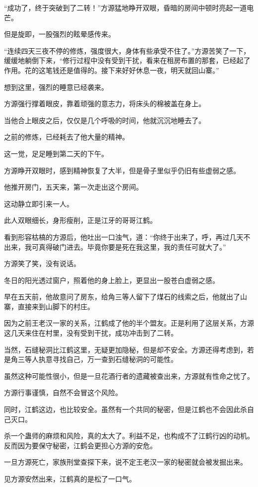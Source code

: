 \begin{this_body}
“成功了，终于突破到了二转！”方源猛地睁开双眼，昏暗的房间中顿时亮起一道电芒。

但是旋即，一股强烈的眩晕感传来。

“连续四天三夜不停的修炼，强度很大，身体有些承受不住了。”方源苦笑了一下，缓缓地躺倒下来，“修行过程中没有受到干扰，看来在租房布置的那套，已经起了作用。花的这笔钱还是值得的。接下来好好休息一夜，明天就回山寨。”

想到这里，强烈的睡意已经袭来。

方源强行撑着眼皮，靠着顽强的意志力，将床头的棉被盖在身上。

当他合上眼皮之后，仅仅是几个呼吸的时间，他就沉沉地睡去了。

之前的修炼，已经耗去了他大量的精神。

这一觉，足足睡到第二天的下午。

方源睁开双眼时，感到精神恢复了大半，但是骨子里似乎仍旧有些虚弱之感。

他推开房门，五天来，第一次走出这个房间。

这动静立即引来一人。

此人双眼细长，身形瘦削，正是江牙的哥哥江鹤。

看到形容枯槁的方源后，他吐出一口浊气，道：“你终于出来了，呼，再过几天不出来，我可真得破门进去。毕竟你要是死在我这里，我的责任可就大了。”

方源笑了笑，没有说话。

冬日的阳光透过窗户，照着他的身上脸上，更显出一股苍白虚弱之感。

早在五天前，他故意问了房东，给角三等人留下了煤石的线索之后，他就出了山寨，直接来到山脚下的村庄。

因为之前王老汉一家的关系，江鹤成了他的半个盟友。正是利用了这层关系，方源这几天来住在村里，没有受到干扰，成功冲击到了二转。

当然，石缝秘洞比江鹤这里，无疑更加隐秘，但是却不安全。方源还得考虑到，若是角三等人执意寻找自己，万一查到石缝秘洞的可能性。

虽然这种可能性很小，但是一旦花酒行者的遗藏被查出来，方源就有性命之忧了。

方源行事谨慎，自然不会冒这个风险。

同时，江鹤这边，也比较安全。虽然有一个共同的秘密，但是江鹤也不会因此杀自己灭口。

杀一个蛊师的麻烦和风险，真的太大了。利益不足，也构成不了江鹤行凶的动机。反而因为要保守秘密，江鹤会更担心方源的安危。

一旦方源死亡，家族刑堂查探下来，说不定王老汉一家的秘密就会被发掘出来。

见方源安然出来，江鹤真的是松了一口气。


\end{this_body}
